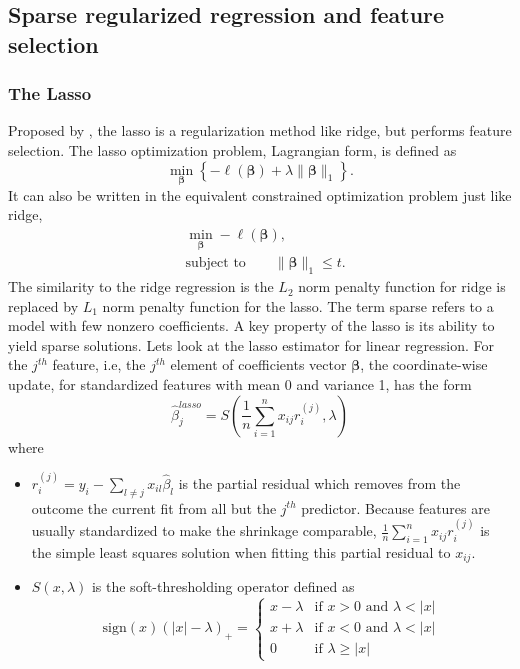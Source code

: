 \subsection{Sparse regularized regression and feature selection} \label{sec:sparse}
\subsubsection{The Lasso}
Proposed by \citep{tibshirani1996regression}, the lasso is a regularization method like ridge, but performs feature selection. The lasso optimization problem, Lagrangian form, is defined as 
\begin{equation}
    \min_{\bm{\beta}} \left\{ -\ell(\bm{\beta})+\lambda\|\bm{\beta}\|_1  \right\}. \label{eq1.6}
\end{equation}
It can also be written in the equivalent constrained optimization problem just like ridge,
\begin{equation}
    \begin{aligned}
    &\min_{\bm{\beta}} -\ell(\bm{\beta}), \\
    &\text{subject to} \qquad \|\bm{\beta}\|_1 \leq t. \label{eq1.7}
    \end{aligned}
\end{equation}
The similarity to the ridge regression is the $L_2$ norm penalty function for ridge is replaced by $L_1$ norm penalty function for the lasso. The term sparse refers to a model with few nonzero coefficients. A key property of the lasso is its ability to yield sparse solutions. Lets look at the lasso estimator for linear regression. For the $j^{th}$ feature, i.e, the $j^{th}$ element of coefficients vector $\bm{\beta}$, the coordinate-wise update, for standardized features with mean 0 and variance 1, has the form
\begin{equation}
    \hat{\beta}_j^{lasso}=S(\frac{1}{n}\sum_{i=1}^{n}x_{ij}r_i^{(j)}, \lambda) \label{eq1.8}
\end{equation}
where 
\begin{itemize}
    \item $r_i^{(j)} = y_i-\sum_{l\neq j}x_{il}\hat{\beta}_l$ is the partial residual which removes from the outcome the current fit from all but the $j^{th}$ predictor. Because features are usually standardized to make the shrinkage comparable, $\frac{1}{n}\sum_{i=1}^{n}x_{ij}r_i^{(j)}$ is the simple least squares solution when fitting this partial residual to $x_{ij}$.
    \item $S(x, \lambda)$ is the soft-thresholding operator defined as 
    \begin{equation}
        \text{sign}(x)(|x|-\lambda)_+ = 
            \begin{cases}
                x-\lambda & \text{if $x>0$ and $\lambda<|x|$}\\
                x+\lambda & \text{if $x<0$ and $\lambda<|x|$}\\
                0 & \text{if $\lambda \geq |x|$}
            \end{cases} \label{eq1.9}      
    \end{equation}
\end{itemize}
